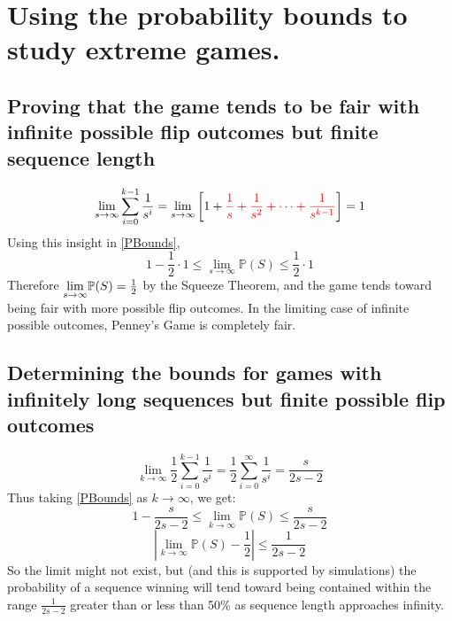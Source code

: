 \documentclass[english,12pt,a4paper,final]{article}
\begin{document}
\section{Using the probability bounds to study extreme games.}

\subsection{Proving that the game tends to be fair with infinite possible flip outcomes but finite sequence length}

\begin{equation*}
	\lim_{s \rightarrow \infty}\sum_{i=0}^{k-1}\frac{1}{s^i} = \lim_{s \rightarrow \infty} \left[1 + \textcolor{red}{\frac{1}{s} + \frac{1}{s^2} + \dots + \frac{1}{s^{k-1}}}\right] = 1
\end{equation*}
Using this insight in \eqref{PBounds},
\begin{equation*}
	1-\frac{1}{2}\cdot1 \le \lim_{s\rightarrow\infty}\mathbb{P}(S) \le \frac{1}{2}\cdot1
\end{equation*}
Therefore $\mathlarger{\lim_{s\rightarrow\infty}}\mathbb{P}(S) = \frac{1}{2}$ by the Squeeze Theorem, and the game tends toward being fair with more possible flip outcomes. In the limiting case of infinite possible outcomes, Penney's Game is completely fair.

\subsection{Determining the bounds for games with infinitely long sequences but finite possible flip outcomes}
\begin{equation*}
	\lim_{k\rightarrow\infty}\frac{1}{2}\sum_{i=0}^{k-1}\frac{1}{s^i} = \frac{1}{2}\sum_{i=0}^{\infty}\frac{1}{s^i} = \frac{s}{2s-2}
\end{equation*}
Thus taking \eqref{PBounds} as $k\rightarrow\infty$, we get:
\begin{equation}\label{PBoundsKToInfty}
	1-\frac{s}{2s-2} \le \lim_{k\rightarrow\infty} \mathbb{P}(S) \le \frac{s}{2s-2} 
\end{equation}
\begin{equation*}
	\left|\lim_{k\rightarrow\infty}\mathbb{P}(S) - \frac{1}{2}\right| \le \frac{1}{2s-2}
\end{equation*}
So the limit might not exist, but (and this is supported by simulations) the probability of a sequence winning will tend toward being contained within the range $\frac{1}{2s-2}$ greater than or less than 50\% as sequence length approaches infinity.
\end{document}
